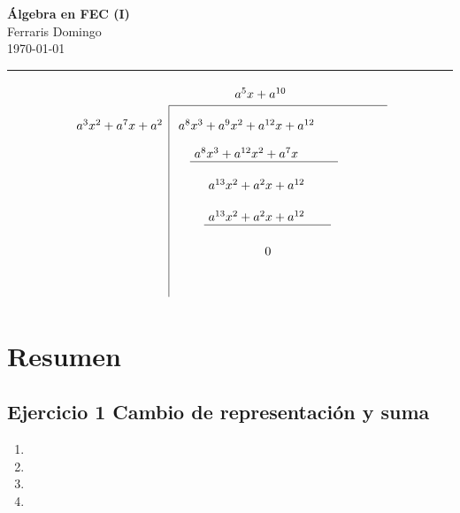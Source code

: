 \documentclass[11pt,fleqn]{article}
\begin{document}

\begin{flushleft}
    {\LARGE \textbf{Álgebra en FEC (I)}}\\[0.5em]
    {\large Ferraris Domingo}\\[0.5em]
    \today
\end{flushleft}

\vspace{0.5em}
\hrule
\vspace{1em}


\[
\begin{tikzpicture}[font=\normalsize]

\node at (5.0,0) {$a^5x+a^{10}$};

\draw (2.4,-0.35) -- (8.6,-0.35);
\draw (2.4,-0.35) -- (2.4,-5.8);

\node[anchor=east] at (2.35,-0.9)
{$a^3x^2+a^7x+a^2$};

\node[anchor=west] at (2.55,-0.9)
{$a^8x^3+a^9x^2+a^{12}x+a^{12}$};


\node[anchor=west] at (3.0,-1.7)
{$a^8x^3+a^{12}x^2+a^7x$};

\draw (3.0,-1.95) -- (7.2,-1.95);


\node[anchor=west] at (3.4,-2.6)
{$a^{13}x^2+a^2x+a^{12}$};


\node[anchor=west] at (3.4,-3.5)
{$a^{13}x^2+a^2x+a^{12}$};

\draw (3.4,-3.75) -- (7.0,-3.75);


\node[anchor=west] at (5.0,-4.5)
{$0$};

\end{tikzpicture}
\]


\section*{Resumen}

\subsection*{Ejercicio 1 Cambio de representación y suma}
\begin{enumerate}[label=\alph*)]
\item {}
\item {}
\item {}
\item {}
\end{enumerate}
\end{document}
